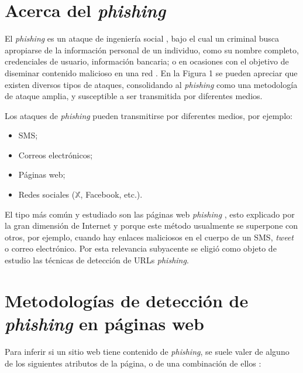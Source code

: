 


\section{Acerca del \textit{phishing}}

El \textit{phishing} es un ataque de ingeniería social \cite{paliath2020}, bajo el cual un criminal busca apropiarse de la información personal de un individuo, como su nombre completo, credenciales de usuario, información bancaria; o en ocasiones con el objetivo de diseminar contenido malicioso en una red \cite{gupta2021}. En la Figura 1 se pueden apreciar que existen diversos tipos de ataques, consolidando al \textit{phishing} como una metodología de ataque amplia, y susceptible a ser transmitida por diferentes medios.


Los ataques de \textit{phishing} pueden transmitirse por diferentes medios, por ejemplo:

\begin{itemize}
    \item SMS;
    \item Correos electrónicos;
    \item Páginas web;
    \item Redes sociales ($\mathbb{X}$, Facebook, etc.).
\end{itemize}

El tipo más común y estudiado son las páginas web \textit{phishing} \cite{abdillah2022}, esto explicado por la gran dimensión de Internet y porque este método usualmente se superpone con otros, por ejemplo, cuando hay enlaces maliciosos en el cuerpo de un SMS, \textit{tweet} o correo electrónico. Por esta relevancia subyacente se eligió como objeto de estudio las técnicas de detección de URLs \textit{phishing}.

\section{Metodologías de detección de \textit{phishing} en páginas web} \label{metodologias-deteccion-phishing}

Para inferir si un sitio web tiene contenido de \textit{phishing}, se suele valer de alguno de los siguientes atributos de la página, o de una combinación de ellos \cite{vijayalakshmi2020}:

